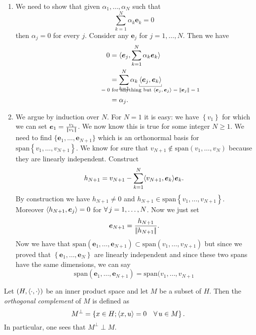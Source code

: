 \documentclass{article}
\begin{document}
\begin{fancyproof}
	\begin{enumerate}
		\item We need to show that given $\alpha_{1},\ldots,\alpha_{N}$ such that
		\begin{equation*}
			\sum_{k=1}^{N}\alpha_{k}\bm{e}_{k}=0
		\end{equation*}
		then $\alpha_{j}=0$ for every $j$. Consider any $\bm{e}_{j}$ for $j=1,\ldots,N$. Then we have
		\begin{align*}
			0&=\inprod{\bm{e}_{j},	\sum_{k=1}^{N}\alpha_{k}\bm{e}_{k}}\\
			&=\sum_{k=1}^{N}\alpha_{k}\ubracketthin{\inprod{\bm{e}_{j},\bm{e}_{k}}}_{\mathclap{\text{$=0$ for anything but $\inprod{\bm{e}_{j},\bm{e}_{j}}=\norm{\bm{e}_{j}}=1$}}}\\
			&=\alpha_{j}.
		\end{align*}
		\item We argue by induction over $N$. For $N=1$ it is easy: we have $\left\{v_{1}\right\}$ for which we can set $\bm{e}_{1}=\frac{v_{1}}{\left|\negthinspace\left|v_{1}\right|\negthinspace\right|}$. We now know this is true for some integer $N\geq1$. We need to find $\{\bm{e}_{1},\ldots,\bm{e}_{N+1}\}$ which is an orthonormal basis for $\mathrm{span}\left\{v_{1},\ldots,v_{N+1}\right\}$. We know for sure that $v_{N+1}\notin\mathrm{span}(v_{1},\ldots,v_{N})$ because they are linearly independent. Construct
		\begin{equation*}
			h_{N+1}=v_{N+1}-\sum_{k=1}^{N}\langle v_{N+1},\bm{e}_{k} \rangle\bm{e}_{k}.
		\end{equation*}
		By construction we have $h_{N+1}\neq0$ and $h_{N+1}\in\mathrm{span}\left\{v_{1},\ldots,v_{N+1}\right\}$. Moreover $\langle h_{N+1},\bm{e}_{j} \rangle=0$ for $\forall\, j=1,\ldots, N$. Now we just set 
		\begin{equation*}
			\bm{e}_{N+1}=\frac{h_{N+1}}{\left|\negthinspace\left|h_{N+1}\right|\negthinspace\right|}.
		\end{equation*}
		Now we have that $\mathrm{span}(\bm{e}_{1},\ldots,\bm{e}_{N+1})\subset\mathrm{span}(v_{1},\ldots,v_{N+1})$ but since we proved that $\left\{\bm{e}_{1},\ldots,\bm{e}_{N}\right\}$ are linearly independent and since these two spans have the same dimensions, we can say
		\begin{equation*}
			\mathrm{span}(\bm{e}_{1},\ldots,\bm{e}_{N+1})=\mathrm{span}(v_{1},\ldots,v_{N+1}
		\end{equation*}
	\end{enumerate}
\end{fancyproof}
\begin{definition}
	Let $\left(H,\langle \cdot,\cdot \rangle\right)$ be an inner product space and let $M$ be a subset of $H$. Then the \emph{orthogonal complement} of $M$ is defined as
	\begin{equation*}
		M^{\perp}=\left\{x\in H; \langle x,u \rangle=0\quad\forall\, u\in M\right\}.
	\end{equation*}
	In particular, one sees that $M^{\perp}\perp M$.
\end{definition}
\end{document}
